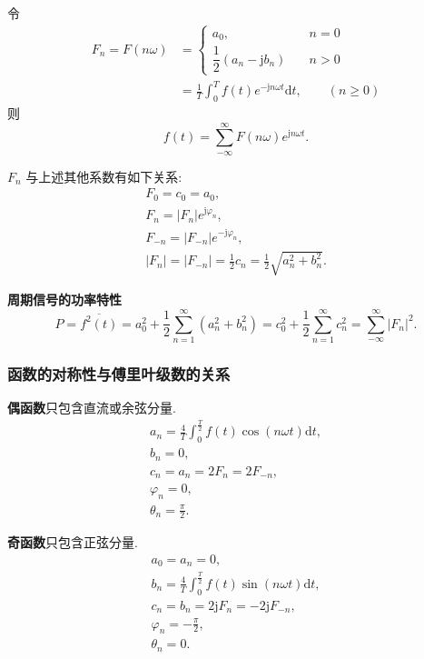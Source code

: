令
\begin{equation} \label{eq:3.1 F n}
    \begin{aligned}
        F_n=F(n\omega) & =\begin{cases}
                              a_0,\quad                            & n=0 \\
                              \dfrac{1}{2}(a_n-\mathrm{j}b_n)\quad & n>0
                          \end{cases}                                      \\
                       & =\frac{1}{T}\int_{0}^{T}f(t)e^{-\mathrm{j}n\omega t}\mathrm{d}t,\qquad (n\geq 0)
    \end{aligned}
\end{equation}
则
\begin{equation} \label{eq:3.1 fourier exponential F}
    f(t)=\sum_{-\infty}^{\infty}F(n\omega)e^{\mathrm{j}n\omega t}.
\end{equation}

$F_n$ 与上述其他系数有如下关系:
\begin{gather}
    F_0=c_0=a_0, \\
    F_n=|F_n|e^{\mathrm{j}\varphi_n}, \\
    F_{-n}=|F_{-n}|e^{-\mathrm{j}\varphi_n}, \\
    |F_n|=|F_{-n}|=\frac{1}{2}c_n=\frac{1}{2}\sqrt{a_n^2+b_n^2}.
\end{gather}

\textbf{周期信号的功率特性}
\begin{equation}
    P=\overline{f^2(t)}=a_0^2+\frac{1}{2}\sum_{n=1}^{\infty}(a_n^2+b_n^2)=c_0^2+\frac{1}{2}\sum_{n=1}^{\infty}c_n^2=\sum_{-\infty}^{\infty}|F_n|^2.
\end{equation}

\subsubsection{函数的对称性与傅里叶级数的关系}
\textbf{偶函数}\quad 只包含直流或余弦分量.
\begin{gather}
    a_n=\frac{4}{T}\int_{0}^{\frac{T}{2}}f(t)\cos(n\omega t)\mathrm{d}t, \\
    b_n=0, \\
    c_n=a_n=2F_n=2F_{-n}, \\
    \varphi_n=0, \\
    \theta_n=\frac{\pi}{2}.
\end{gather}

\textbf{奇函数}\quad 只包含正弦分量.
\srmg
\begin{gather}
    a_0=a_n=0, \\
    b_n=\frac{4}{T}\int_{0}^{\frac{T}{2}}f(t)\sin(n\omega t)\mathrm{d}t, \\
    c_n=b_n=2\mathrm{j}F_n=-2\mathrm{j}F_{-n}, \\
    \varphi_n=-\frac{\pi}{2}, \\
    \theta_n=0.
\end{gather}

